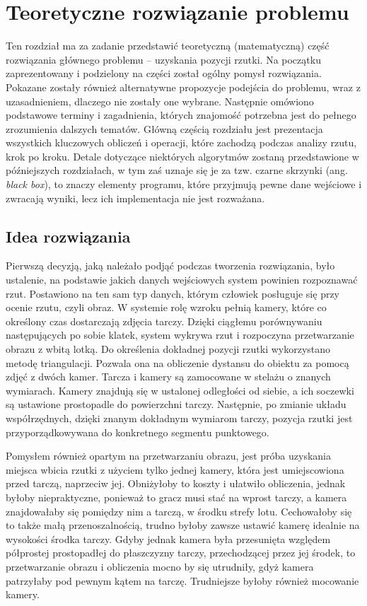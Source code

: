\chapter{Teoretyczne rozwiązanie problemu}
\thispagestyle{chapterBeginStyle}

Ten rozdział ma za zadanie przedstawić teoretyczną (matematyczną) część rozwiązania głównego problemu -- uzyskania pozycji rzutki. Na początku zaprezentowany i podzielony na części został ogólny pomysł rozwiązania. Pokazane zostały również alternatywne propozycje podejścia do problemu, wraz z uzasadnieniem, dlaczego nie zostały one wybrane. Następnie omówiono podstawowe terminy i zagadnienia, których znajomość potrzebna jest do pełnego zrozumienia dalszych tematów. Główną częścią rozdziału jest prezentacja wszystkich kluczowych obliczeń i operacji, które zachodzą podczas analizy rzutu, krok po kroku. Detale dotyczące niektórych algorytmów zostaną przedstawione w późniejszych rozdziałach, w tym zaś uznaje się je za tzw. czarne skrzynki (ang. \textit{black box}), to znaczy elementy programu, które przyjmują pewne dane wejściowe i zwracają wyniki, lecz ich implementacja nie jest rozważana.

\section{Idea rozwiązania}
Pierwszą decyzją, jaką należało podjąć podczas tworzenia rozwiązania, było ustalenie, na podstawie jakich danych wejściowych system powinien rozpoznawać rzut. Postawiono na ten sam typ danych, którym człowiek posługuje się przy ocenie rzutu, czyli obraz. W systemie rolę wzroku pełnią kamery, które co określony czas dostarczają zdjęcia tarczy. Dzięki ciągłemu porównywaniu następujących po sobie klatek, system wykrywa rzut i rozpoczyna przetwarzanie obrazu z wbitą lotką. Do określenia dokładnej pozycji rzutki wykorzystano metodę triangulacji. Pozwala ona na obliczenie dystansu do obiektu za pomocą zdjęć z dwóch kamer. Tarcza i kamery są zamocowane w stelażu o znanych wymiarach. Kamery znajdują się w ustalonej odległości od siebie, a ich soczewki są ustawione prostopadle do powierzchni tarczy. Następnie, po zmianie układu współrzędnych, dzięki znanym dokładnym wymiarom tarczy, pozycja rzutki jest przyporządkowywana do konkretnego segmentu punktowego.

Pomysłem również opartym na przetwarzaniu obrazu, jest próba uzyskania miejsca wbicia rzutki z użyciem tylko jednej kamery, która jest umiejscowiona przed tarczą, naprzeciw jej. Obniżyłoby to koszty i ułatwiło obliczenia, jednak byłoby niepraktyczne, ponieważ to gracz musi stać na wprost tarczy, a kamera znajdowałaby się pomiędzy nim a tarczą, w środku strefy lotu. Cechowałoby się to także małą przenoszalnością, trudno byłoby zawsze ustawić kamerę idealnie na wysokości środka tarczy. Gdyby jednak kamera była przesunięta względem półprostej prostopadłej do płaszczyzny tarczy, przechodzącej przez jej środek, to przetwarzanie obrazu i obliczenia mocno by się utrudniły, gdyż kamera patrzyłaby pod pewnym kątem na tarczę. Trudniejsze byłoby również mocowanie kamery.

